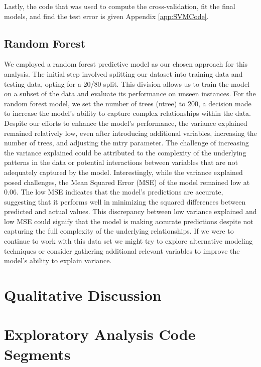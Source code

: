 \documentclass{article}
\begin{document}
    Lastly, the code that was used to compute the cross-validation, fit the final models, and find the test error is given  Appendix \ref{app:SVMCode}.
	

    \subsection{Random Forest}
    \hspace{\parindent} 

We employed a random forest predictive model as our chosen approach for this analysis. The initial step involved splitting our dataset into training data and testing data, opting for a 20/80 split. This division allows us to train the model on a subset of the data and evaluate its performance on unseen instances. For the random forest model, we set the number of trees (ntree) to 200, a decision made to increase the model's ability to capture complex relationships within the data.
Despite our efforts to enhance the model's performance, the variance explained remained relatively low, even after introducing additional variables, increasing the number of trees, and adjusting the mtry parameter. The challenge of increasing the variance explained could be attributed to the complexity of the underlying patterns in the data or potential interactions between variables that are not adequately captured by the model.
Interestingly, while the variance explained posed challenges, the Mean Squared Error (MSE) of the model remained low at 0.06. The low MSE indicates that the model's predictions are accurate, suggesting that it performs well in minimizing the squared differences between predicted and actual values. This discrepancy between low variance explained and low MSE could signify that the model is making accurate predictions despite not capturing the full complexity of the underlying relationships.
If we were to continue to work with this data set we might try to explore alternative modeling techniques  or consider gathering additional relevant variables to improve the model's ability to explain variance. 
    
\section{Qualitative Discussion}
\hspace{\parindent} 

\appendix 

\section{Exploratory Analysis Code Segments}
\end{document}
